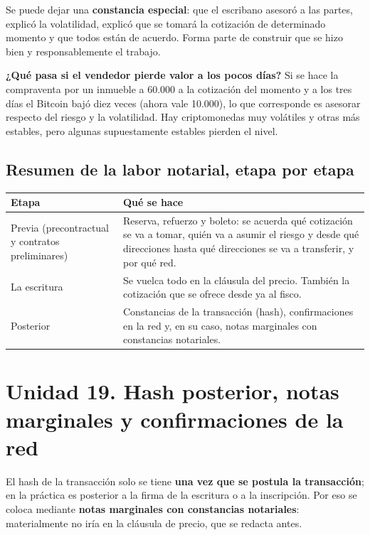 \documentclass[12pt,oneside,a4paper]{book}
\begin{document}
Se puede dejar una \textbf{constancia especial}: que el escribano asesoró a las partes, explicó la volatilidad, explicó que se tomará la cotización de determinado momento y que todos están de acuerdo. Forma parte de construir que se hizo bien y responsablemente el trabajo.

\textbf{¿Qué pasa si el vendedor pierde valor a los pocos días?} Si se hace la compraventa por un inmueble a 60.000 a la cotización del momento y a los tres días el Bitcoin bajó diez veces (ahora vale 10.000), lo que corresponde es asesorar respecto del riesgo y la volatilidad. Hay criptomonedas muy volátiles y otras más estables, pero algunas supuestamente estables pierden el nivel.

\subsection{Resumen de la labor notarial, etapa por etapa}

\begin{longtable}{@{}>{\RaggedRight\arraybackslash}p{}>{\RaggedRight\arraybackslash}p{}@{}}
\toprule
\textbf{Etapa} & \textbf{Qué se hace} \\
\midrule
\endhead
Previa (precontractual y contratos preliminares) &
Reserva, refuerzo y boleto: se acuerda qué cotización se va a tomar, quién va a asumir el riesgo y desde qué direcciones hasta qué direcciones se va a transferir, y por qué red. \\
\addlinespace
La escritura &
Se vuelca todo en la cláusula del precio. También la cotización que se ofrece desde ya al fisco. \\
\addlinespace
Posterior &
Constancias de la transacción (hash), confirmaciones en la red y, en su caso, notas marginales con constancias notariales. \\
\bottomrule
\end{longtable}

\section{Unidad 19. Hash posterior, notas marginales y confirmaciones de la red}

El hash de la transacción solo se tiene \textbf{una vez que se postula la transacción}; en la práctica es posterior a la firma de la escritura o a la inscripción. Por eso se coloca mediante \textbf{notas marginales con constancias notariales}: materialmente no iría en la cláusula de precio, que se redacta antes.
\end{document}
